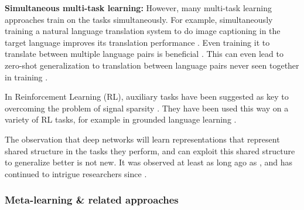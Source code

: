 \documentclass[11pt]{article}
\begin{document}
\textbf{Simultaneous multi-task learning:} However, many multi-task learning approaches train on the tasks simultaneously. For example, simultaneously training a natural language translation system to do image captioning in the target language improves its translation performance \citep{Luong2016}. Even training it to translate between multiple language pairs is beneficial \citep{Dong2015}. This can even lead to zero-shot generalization to translation between language pairs never seen together in training \citep{Johnson2016a}. \par 
In Reinforcement Learning (RL), auxiliary tasks have been suggested as key to overcoming the problem of signal sparsity \citep[e.g.]{LeCun2016}. They have been used this way on a variety of RL tasks, for example in grounded language learning \citep{Hermann2017}. \par
The observation that deep networks will learn representations that represent shared structure in the tasks they perform, and can exploit this shared structure to generalize better is not new. It was observed at least as long ago as \citet{Hinton1986}, and has continued to intrigue researchers since \citep[e.g]{Rogers2008}.  


\subsubsection{Meta-learning \& related approaches}
\end{document}
